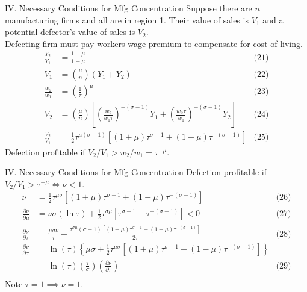 \documentclass[11pt,notes=hide,aspectratio=169]{beamer}
\begin{document}
\begin{frame}{IV. Necessary Conditions for Mfg Concentration}
Suppose there are $n$ manufacturing firms and all are in region 1.
Their value of sales is $V_1$ and a potential defector's value of sales is $V_2$. \\
Defecting firm must pay workers wage premium to compensate for cost of living.
\begin{align*}
\frac{Y_2}{Y_1} 
&=
\frac{1-\mu}{1+\mu}
& \text{(21)} \\
V_1 
&=
\left(\frac{\mu}{n}\right) \left(Y_1+Y_2\right)
& \text{(22)} \\
\frac{w_2}{w_1} 
&=
\left(\frac{1}{\tau}\right)^{\mu}
& \text{(23)} \\
V_2 
&=
\left(\frac{\mu}{n}\right)\left[\left(\frac{w_2}{w_1 \tau}\right)^{-(\sigma-1)}Y_1 + \left(\frac{w_2 \tau}{w_1}\right)^{-(\sigma-1)}Y_2 \right]
& \text{(24)} \\
\frac{V_2}{V_1} 
&=
\frac{1}{2} \tau^{\mu(\sigma-1)}\left[\left(1+\mu\right)\tau^{\sigma-1} + (1-\mu)\tau^{-(\sigma-1)}\right]
& \text{(25)}
\end{align*}
Defection profitable if $V_2/V_1 > w_2 / w_1 = \tau^{-\mu}$.
\end{frame}
\begin{frame}{IV. Necessary Conditions for Mfg Concentration}
Defection profitable if $V_2/V_1 > \tau^{-\mu} \iff \nu <1$.
\begin{align*}
\nu 
&=
\frac{1}{2} \tau^{\mu\sigma}\left[\left(1+\mu\right)\tau^{\sigma-1} + (1-\mu)\tau^{-(\sigma-1)}\right]
& \text{(26)} \\
\frac{\partial\nu}{\partial\mu} 
&=
\nu\sigma(\ln\tau) + \frac{1}{2}\tau^{\sigma\mu} \left[\tau^{\sigma-1} - \tau^{-(\sigma-1)}\right]
< 0
& \text{(27)} \\
\frac{\partial\nu}{\partial\tau} 
&=
\frac{\mu\sigma\nu}{\tau} + \frac{\tau^{\sigma\mu}(\sigma-1)\left[\left(1+\mu\right)\tau^{\sigma-1} - (1-\mu)\tau^{-(\sigma-1)}\right]}{2\tau}
& \text{(28)} \\
\frac{\partial\nu}{\partial\sigma} 
&=
\ln(\tau) \left\{\mu\sigma + \frac{1}{2}\tau^{\mu\sigma}\left[\left(1+\mu\right)\tau^{\sigma-1} - (1-\mu)\tau^{-(\sigma-1)}\right]\right\}
\\
&= \ln(\tau) \left(\frac{\tau}{\sigma}\right) \left(\frac{\partial \nu}{\partial \tau}\right)
& \text{(29)} \\
\end{align*}
Note $\tau=1\implies\nu=1$.
\end{frame}
\end{document}

